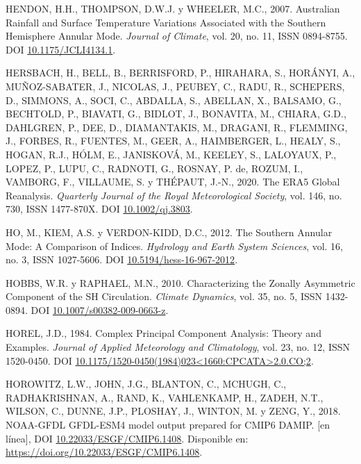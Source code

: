 \documentclass[12pt,oneside,a4paper]{reedthesis}
\newlength{\cslhangindent}
\newenvironment{CSLReferences}[2] %
 {%
  \setlength{\parindent}{0pt}
  \ifodd #1 \everypar{\setlength{\hangindent}{\cslhangindent}}\ignorespaces\fi
  \ifnum #2 > 0
  \setlength{\parskip}{#2\baselineskip}
  \fi
 }%
 {}
\begin{document}
\begin{CSLReferences}{1}{0}
\leavevmode{}%
HENDON, H.H., THOMPSON, D.W.J. y WHEELER, M.C., 2007. Australian {Rainfall} and {Surface Temperature Variations Associated} with the {Southern Hemisphere Annular Mode}. \emph{Journal of Climate}, vol. 20, no. 11, ISSN 0894-8755. DOI \href{https://doi.org/10.1175/JCLI4134.1}{10.1175/JCLI4134.1}.

\leavevmode{}%
HERSBACH, H., BELL, B., BERRISFORD, P., HIRAHARA, S., HORÁNYI, A., MUÑOZ-SABATER, J., NICOLAS, J., PEUBEY, C., RADU, R., SCHEPERS, D., SIMMONS, A., SOCI, C., ABDALLA, S., ABELLAN, X., BALSAMO, G., BECHTOLD, P., BIAVATI, G., BIDLOT, J., BONAVITA, M., CHIARA, G.D., DAHLGREN, P., DEE, D., DIAMANTAKIS, M., DRAGANI, R., FLEMMING, J., FORBES, R., FUENTES, M., GEER, A., HAIMBERGER, L., HEALY, S., HOGAN, R.J., HÓLM, E., JANISKOVÁ, M., KEELEY, S., LALOYAUX, P., LOPEZ, P., LUPU, C., RADNOTI, G., ROSNAY, P. de, ROZUM, I., VAMBORG, F., VILLAUME, S. y THÉPAUT, J.-N., 2020. The {ERA5} Global Reanalysis. \emph{Quarterly Journal of the Royal Meteorological Society}, vol. 146, no. 730, ISSN 1477-870X. DOI \href{https://doi.org/10.1002/qj.3803}{10.1002/qj.3803}.

\leavevmode{}%
HO, M., KIEM, A.S. y VERDON-KIDD, D.C., 2012. The {Southern Annular Mode}: A Comparison of Indices. \emph{Hydrology and Earth System Sciences}, vol. 16, no. 3, ISSN 1027-5606. DOI \href{https://doi.org/10.5194/hess-16-967-2012}{10.5194/hess-16-967-2012}.

\leavevmode{}%
HOBBS, W.R. y RAPHAEL, M.N., 2010. Characterizing the Zonally Asymmetric Component of the {SH} Circulation. \emph{Climate Dynamics}, vol. 35, no. 5, ISSN 1432-0894. DOI \href{https://doi.org/10.1007/s00382-009-0663-z}{10.1007/s00382-009-0663-z}.

\leavevmode{}%
HOREL, J.D., 1984. Complex {Principal Component Analysis}: {Theory} and {Examples}. \emph{Journal of Applied Meteorology and Climatology}, vol. 23, no. 12, ISSN 1520-0450. DOI \href{https://doi.org/10.1175/1520-0450(1984)023\%3C1660:CPCATA\%3E2.0.CO;2}{10.1175/1520-0450(1984)023\textless1660:CPCATA\textgreater2.0.CO;2}.

\leavevmode{}%
HOROWITZ, L.W., JOHN, J.G., BLANTON, C., MCHUGH, C., RADHAKRISHNAN, A., RAND, K., VAHLENKAMP, H., ZADEH, N.T., WILSON, C., DUNNE, J.P., PLOSHAY, J., WINTON, M. y ZENG, Y., 2018. NOAA-GFDL GFDL-ESM4 model output prepared for CMIP6 DAMIP. {[}en línea{]}, DOI \href{https://doi.org/10.22033/ESGF/CMIP6.1408}{10.22033/ESGF/CMIP6.1408}. Disponible en: \url{https://doi.org/10.22033/ESGF/CMIP6.1408}.


\end{CSLReferences}
\end{document}
